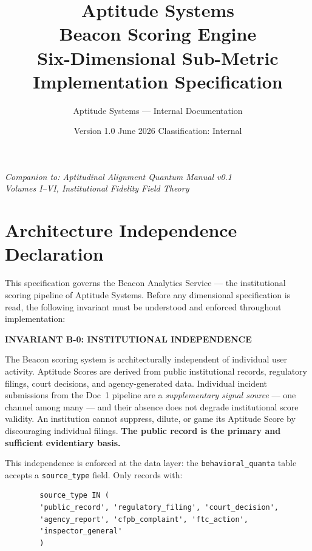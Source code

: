 \documentclass[a4paper,11pt]{article}
\title{%
	{\sffamily\Huge\bfseries\color{navy} Aptitude Systems}\\[0.5em]
	{\sffamily\Large\color{aptblue} Beacon Scoring Engine}\\[0.3em]
	{\sffamily\large\color{aptslate} Six-Dimensional Sub-Metric Implementation Specification}%
}
\author{Aptitude Systems — Internal Documentation}
\date{Version 1.0 \quad June 2026 \quad Classification: Internal}
\begin{document}
	\setlength{\tabcolsep}{4pt}
	
	\maketitle
	\thispagestyle{empty}
	
	\begin{center}
		\textit{Companion to: Aptitudinal Alignment Quantum Manual v0.1}\\
		\textit{Volumes I--VI, Institutional Fidelity Field Theory}
	\end{center}
	
	\vspace{1em}
	\tableofcontents
	\newpage
	
	\section{Architecture Independence Declaration}
	
	This specification governs the Beacon Analytics Service — the institutional scoring pipeline of Aptitude Systems. Before any dimensional specification is read, the following invariant must be understood and enforced throughout implementation:
	
	\begin{invariantbox}
		\textbf{\sffamily INVARIANT B-0: INSTITUTIONAL INDEPENDENCE}
		
		\medskip
		The Beacon scoring system is architecturally independent of individual user activity. Aptitude Scores are derived from public institutional records, regulatory filings, court decisions, and agency-generated data. Individual incident submissions from the Doc~1 pipeline are a \emph{supplementary signal source} — one channel among many — and their absence does not degrade institutional score validity. An institution cannot suppress, dilute, or game its Aptitude Score by discouraging individual filings. \textbf{The public record is the primary and sufficient evidentiary basis.}
	\end{invariantbox}
	
	\bigskip
	This independence is enforced at the data layer: the \texttt{behavioral\_quanta} table accepts a \texttt{source\_type} field. Only records with:
	
	\begin{lstlisting}
		source_type IN (
		'public_record', 'regulatory_filing', 'court_decision',
		'agency_report', 'cfpb_complaint', 'ftc_action',
		'inspector_general'
		)
	\end{lstlisting}
	
\end{document}
